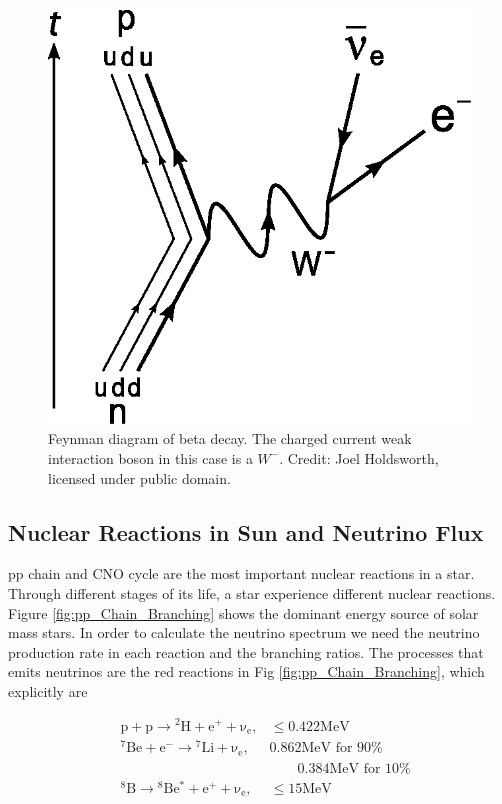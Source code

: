 \begin{figure}[ht]
\centering
\includegraphics{chapters/assets/solar/Beta_Negative_Decay.eps}
\caption{Feynman diagram of beta decay. The charged current weak interaction boson in this case is a $W^-$. Credit: Joel Holdsworth, licensed under public domain.}
\label{fig:Beta_Negative_Decay}
\end{figure}

\subsection{Nuclear Reactions in Sun and Neutrino Flux}

pp chain and CNO cycle are the most important nuclear reactions in a star. Through different stages of its life, a star experience different nuclear reactions. Figure \ref{fig:pp_Chain_Branching} shows the dominant energy source of solar mass stars. In order to calculate the neutrino spectrum we need the neutrino production rate in each reaction and the branching ratios. The processes that emits neutrinos are the red reactions in Fig \ref{fig:pp_Chain_Branching}, which explicitly are

\begin{align}
&\mathrm{p+p\to {}^2H + e^+ +\nu_e},  & \mathrm{\leq 0.422MeV}\\
&\mathrm{{}^7Be + e^- \to {}^7Li + \nu_e} , &\text{0.862MeV for 90\%}\\
&&\qquad \text{0.384MeV for 10\%} \\
&\mathrm{{}^8B \to {}^8Be^* +e^+ +\nu_e},  & \mathrm{\leq 15 MeV}
\end{align}




